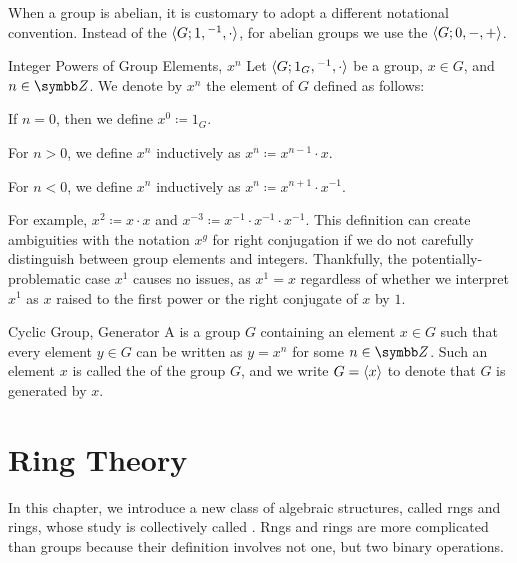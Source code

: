 \documentclass[12pt]{report}
\begin{document}
When a group is abelian, it is customary to adopt a different notational convention. Instead of the  ${\langle {G; 1, {}^{-1}, \cdot} \rangle}$, for abelian groups we use the  ${\langle {G; 0, -, +} \rangle}$.

\begin{dfnbox}{Integer Powers of Group Elements, $x^n$}
	Let ${\langle {G; 1_G, {}^{-1}, \cdot} \rangle}$ be a group, $x \in G$, and $n \in \Z$. We denote by $x^n$ the element of $G$ defined as follows:
	\begin{dfnitems}
		\item If $n = 0$, then we define $x^0 \coloneq 1_G$.
		\item For $n > 0$, we define $x^n$ inductively as $x^n \coloneq x^{n-1} \cdot x$.
		\item For $n < 0$, we define $x^n$ inductively as $x^n \coloneq x^{n+1} \cdot x^{-1}$.
	\end{dfnitems}
\end{dfnbox}

For example, $x^2 \coloneq x \cdot x$ and $x^{-3} \coloneq x^{-1} \cdot x^{-1} \cdot x^{-1}$. This definition can create ambiguities with the notation $x^g$ for right conjugation if we do not carefully distinguish between group elements and integers. Thankfully, the potentially-problematic case $x^1$ causes no issues, as $x^1 = x$ regardless of whether we interpret $x^1$ as $x$ raised to the first power or the right conjugate of $x$ by $1$.

\begin{dfnbox}{Cyclic Group, Generator}
	A  is a group $G$ containing an element $x \in G$ such that every element $y \in G$ can be written as $y = x^n$ for some $n \in \Z$. Such an element $x$ is called the  of the group $G$, and we write $G = {\langle {x} \rangle}$ to denote that $G$ is generated by $x$.
\end{dfnbox}



\chapter{Ring Theory}

In this chapter, we introduce a new class of algebraic structures, called rngs and rings, whose study is collectively called . Rngs and rings are more complicated than groups because their definition involves not one, but two binary operations.
\end{document}
